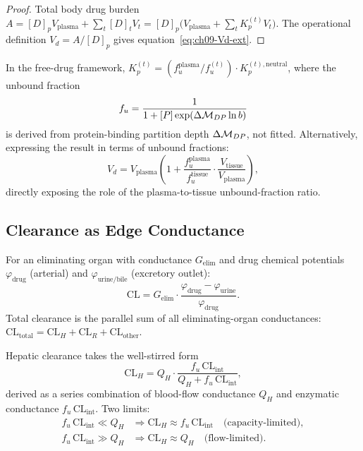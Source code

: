 \begin{proof}
Total body drug burden $A = [D]_p V_{\mathrm{plasma}} +
\sum_t [D]_t V_t = [D]_p\bigl(V_{\mathrm{plasma}} + \sum_t K_p^{(t)} V_t\bigr)$.
The operational definition $V_d = A/[D]_p$ gives equation~\eqref{eq:ch09-Vd-ext}.
\end{proof}

In the free-drug framework, $K_p^{(t)} = (f_u^{\mathrm{plasma}}/
f_u^{(t)})\cdot K_p^{(t),\mathrm{neutral}}$, where the unbound fraction
\begin{equation}
  f_u = \frac{1}{1 + [P]\exp(\Delta\mathcal{M}_{DP}\ln b)}
  \label{eq:ch09-fu}
\end{equation}
is derived from protein-binding partition depth $\Delta\mathcal{M}_{DP}$, not fitted.
Alternatively, expressing the result in terms of unbound fractions:
\begin{equation}
  V_d = V_{\mathrm{plasma}}\!\left(1 + \frac{f_u^{\mathrm{plasma}}}{f_u^{\mathrm{tissue}}}
      \cdot\frac{V_{\mathrm{tissue}}}{V_{\mathrm{plasma}}}\right),
  \label{eq:ch09-Vd-fuform}
\end{equation}
directly exposing the role of the plasma-to-tissue unbound-fraction ratio.

\subsection{Clearance as Edge Conductance}
\label{subsec:ch09-clearance}

\begin{theorem}
\label{thm:ch09-CL}
For an eliminating organ with conductance $G_{\mathrm{elim}}$ and drug
chemical potentials $\varphi_{\mathrm{drug}}$ (arterial) and
$\varphi_{\mathrm{urine/bile}}$ (excretory outlet):
\begin{equation}
  \mathrm{CL} = G_{\mathrm{elim}}\cdot
      \frac{\varphi_{\mathrm{drug}} - \varphi_{\mathrm{urine}}}
           {\varphi_{\mathrm{drug}}}.
  \label{eq:ch09-CL}
\end{equation}
Total clearance is the parallel sum of all eliminating-organ conductances:
$\mathrm{CL}_{\mathrm{total}} = \mathrm{CL}_H + \mathrm{CL}_R +
\mathrm{CL}_{\mathrm{other}}$.
\end{theorem}

Hepatic clearance takes the well-stirred form
\begin{equation}
  \mathrm{CL}_H = Q_H\cdot
    \frac{f_u\,\mathrm{CL}_{\mathrm{int}}}{Q_H + f_u\,\mathrm{CL}_{\mathrm{int}}},
  \label{eq:ch09-CLH}
\end{equation}
derived as a series combination of blood-flow conductance $Q_H$ and enzymatic
conductance $f_u\,\mathrm{CL}_{\mathrm{int}}$.  Two limits:
\begin{align}
  f_u\,\mathrm{CL}_{\mathrm{int}} \ll Q_H
    &\Rightarrow \mathrm{CL}_H \approx f_u\,\mathrm{CL}_{\mathrm{int}}
      \quad\text{(capacity-limited)},\\
  f_u\,\mathrm{CL}_{\mathrm{int}} \gg Q_H
    &\Rightarrow \mathrm{CL}_H \approx Q_H
      \quad\text{(flow-limited)}.
\end{align}

